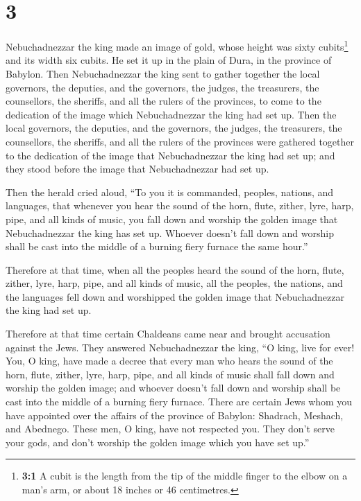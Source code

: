 \hypertarget{section-2}{%
\section{3}\label{section-2}}

 Nebuchadnezzar the king made an image of gold, whose
height was sixty cubits\footnote{\textbf{3:1} A cubit is the length from
  the tip of the middle finger to the elbow on a man's arm, or about 18
  inches or 46 centimetres.} and its width six cubits. He set it up in
the plain of Dura, in the province of Babylon.  Then
Nebuchadnezzar the king sent to gather together the local governors, the
deputies, and the governors, the judges, the treasurers, the
counsellors, the sheriffs, and all the rulers of the provinces, to come
to the dedication of the image which Nebuchadnezzar the king had set up.
 Then the local governors, the deputies, and the
governors, the judges, the treasurers, the counsellors, the sheriffs,
and all the rulers of the provinces were gathered together to the
dedication of the image that Nebuchadnezzar the king had set up; and
they stood before the image that Nebuchadnezzar had set up.

 Then the herald cried aloud, ``To you it is commanded,
peoples, nations, and languages,  that whenever you hear
the sound of the horn, flute, zither, lyre, harp, pipe, and all kinds of
music, you fall down and worship the golden image that Nebuchadnezzar
the king has set up.  Whoever doesn't fall down and
worship shall be cast into the middle of a burning fiery furnace the
same hour.''

 Therefore at that time, when all the peoples heard the
sound of the horn, flute, zither, lyre, harp, pipe, and all kinds of
music, all the peoples, the nations, and the languages fell down and
worshipped the golden image that Nebuchadnezzar the king had set up.

 Therefore at that time certain Chaldeans came near and
brought accusation against the Jews.  They answered
Nebuchadnezzar the king, ``O king, live for ever!  You, O
king, have made a decree that every man who hears the sound of the horn,
flute, zither, lyre, harp, pipe, and all kinds of music shall fall down
and worship the golden image;  and whoever doesn't fall
down and worship shall be cast into the middle of a burning fiery
furnace.  There are certain Jews whom you have appointed
over the affairs of the province of Babylon: Shadrach, Meshach, and
Abednego. These men, O king, have not respected you. They don't serve
your gods, and don't worship the golden image which you have set up.''

